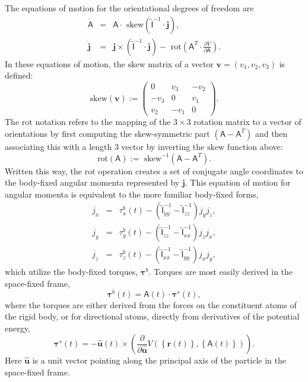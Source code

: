 \documentclass[]{book}
\begin{document}
The equations of motion for the orientational degrees of freedom are
\begin{eqnarray}
\dot{\mathsf{A}} & = & \mathsf{A} \cdot
\mbox{ skew}\left(\overleftrightarrow{\mathsf{I}}^{-1} \cdot \mathbf{j}\right),\\
\dot{\mathbf{j}} & = & \mathbf{j} \times \left( \overleftrightarrow{\mathsf{I}}^{-1}
\cdot \mathbf{j} \right) - \mbox{ rot}\left(\mathsf{A}^{T} \cdot \frac{\partial
V}{\partial \mathsf{A}} \right).
\end{eqnarray}
In these equations of motion, the $\mbox{skew}$ matrix of a vector
$\mathbf{v} = \left( v_1, v_2, v_3 \right)$ is defined:
\begin{equation}
\mbox{skew}\left( \mathbf{v} \right) := \left( 
\begin{array}{ccc}
0 & v_3 & - v_2 \\
-v_3 & 0 & v_1 \\
v_2 & -v_1 & 0 
\end{array}
\right).
\end{equation}
The $\mbox{rot}$ notation refers to the mapping of the $3 \times 3$
rotation matrix to a vector of orientations by first computing the
skew-symmetric part $\left(\mathsf{A} - \mathsf{A}^{T}\right)$ and
then associating this with a length 3 vector by inverting the
$\mbox{skew}$ function above:
\begin{equation}
\mbox{rot}\left(\mathsf{A}\right) := \mbox{ skew}^{-1}\left(\mathsf{A}
- \mathsf{A}^{T} \right).
\end{equation}
Written this way, the $\mbox{rot}$ operation creates a set of
conjugate angle coordinates to the body-fixed angular momenta
represented by $\mathbf{j}$.  This equation of motion for angular momenta
is equivalent to the more familiar body-fixed forms,
\begin{eqnarray}
\dot{j_{x}} & = & \tau^b_x(t)  -
\left(\overleftrightarrow{\mathsf{I}}_{yy}^{-1} - \overleftrightarrow{\mathsf{I}}_{zz}^{-1} \right) j_y j_z, \\
\dot{j_{y}} & = & \tau^b_y(t) -
\left(\overleftrightarrow{\mathsf{I}}_{zz}^{-1} - \overleftrightarrow{\mathsf{I}}_{xx}^{-1} \right) j_z j_x,\\
\dot{j_{z}} & = & \tau^b_z(t) -
\left(\overleftrightarrow{\mathsf{I}}_{xx}^{-1} - \overleftrightarrow{\mathsf{I}}_{yy}^{-1} \right) j_x j_y, 
\end{eqnarray}
which utilize the body-fixed torques, $\mathbf{\tau}^b$. Torques are
most easily derived in the space-fixed frame, 
\begin{equation}
\mathbf{\tau}^b(t) = \mathsf{A}(t) \cdot \mathbf{\tau}^s(t),
\end{equation}
where the torques are either derived from the forces on the
constituent atoms of the rigid body, or for directional atoms,
directly from derivatives of the potential energy,
\begin{equation}
\mathbf{\tau}^s(t) = - \hat{\mathbf{u}}(t) \times \left( \frac{\partial}
{\partial \hat{\mathbf{u}}} V\left(\left\{ \mathbf{r}(t) \right\}, \left\{
\mathsf{A}(t) \right\}\right) \right).
\end{equation}
Here $\hat{\mathbf{u}}$ is a unit vector pointing along the principal axis
of the particle in the space-fixed frame.
\end{document}
